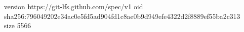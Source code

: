 version https://git-lfs.github.com/spec/v1
oid sha256:796049202e34ac0e5fd5ad904fd1c8ae0b9d949efe4322d2f8889ef55ba2c313
size 5566
